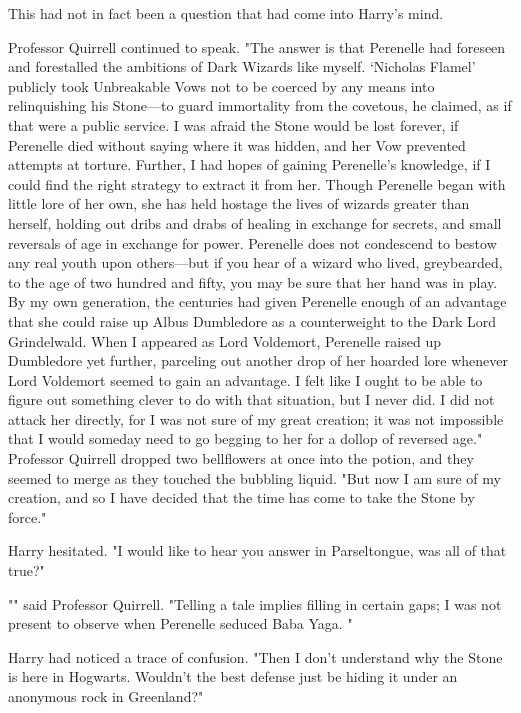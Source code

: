 This had not in fact been a question that had come into Harry's mind.

Professor Quirrell continued to speak. "The answer is that Perenelle had 
foreseen and forestalled the ambitions of Dark Wizards like myself. `Nicholas 
Flamel' publicly took Unbreakable Vows not to be coerced by any means into 
relinquishing his Stone---to guard immortality from the covetous, he claimed, 
as if that were a public service. I was afraid the Stone would be lost forever, 
if Perenelle died without saying where it was hidden, and her Vow prevented 
attempts at torture. Further, I had hopes of gaining Perenelle's knowledge, if 
I could find the right strategy to extract it from her. Though Perenelle began 
with little lore of her own, she has held hostage the lives of wizards greater 
than herself, holding out dribs and drabs of healing in exchange for secrets, 
and small reversals of age in exchange for power. Perenelle does not condescend 
to bestow any real youth upon others---but if you hear of a wizard who lived, 
greybearded, to the age of two hundred and fifty, you may be sure that her hand 
was in play. By my own generation, the centuries had given Perenelle enough of 
an advantage that she could raise up Albus Dumbledore as a counterweight to the 
Dark Lord Grindelwald. When I appeared as Lord Voldemort, Perenelle raised up 
Dumbledore yet further, parceling out another drop of her hoarded lore whenever 
Lord Voldemort seemed to gain an advantage. I felt like I ought to be able to 
figure out something clever to do with that situation, but I never did. I did 
not attack her directly, for I was not sure of my great creation; it was not 
impossible that I would someday need to go begging to her for a dollop of 
reversed age." Professor Quirrell dropped two bellflowers at once into the 
potion, and they seemed to merge as they touched the bubbling liquid. "But now 
I am sure of my creation, and so I have decided that the time has come to take 
the Stone by force."

Harry hesitated. "I would like to hear you answer in Parseltongue, was all of 
that true?"

"" said Professor Quirrell. 
"Telling a tale implies filling in certain gaps; I was not present to observe 
when Perenelle seduced Baba Yaga. "

Harry had noticed a trace of confusion. "Then I don't understand why the 
Stone is here in Hogwarts. Wouldn't the best defense just be hiding it under an 
anonymous rock in Greenland?"

